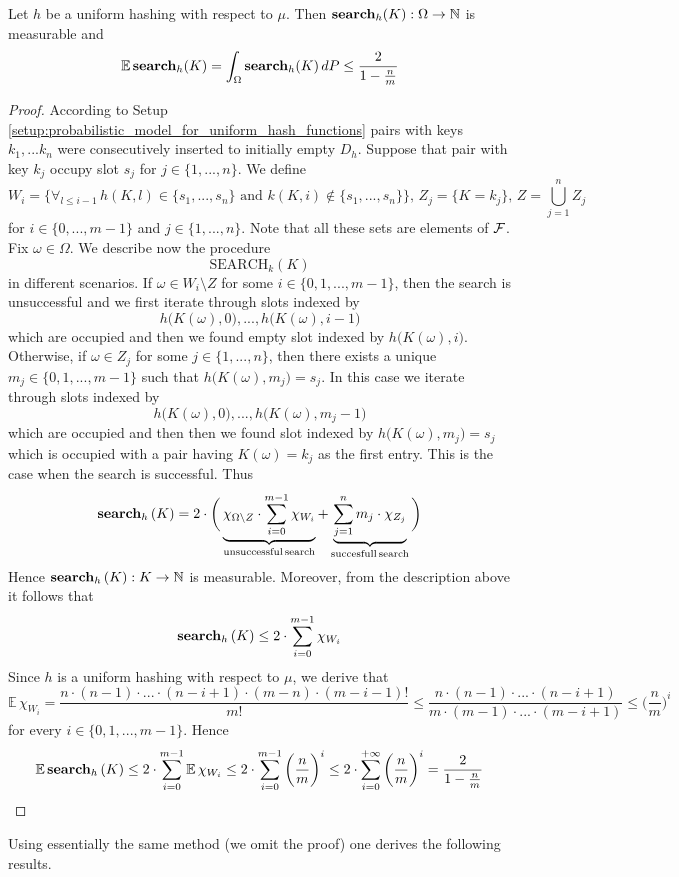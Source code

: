 \begin{theorem}\label{theorem:open_addressing_under_uniform_hashing_analysis_of_search}
Let $h$ be a uniform hashing with respect to $\mu$. Then $\mathbf{search}_h(K):\Omega \rightarrow {\mathbb N}$ is measurable and
$$\mathbb{E}\,\mathbf{search}_h(K) = \int_{\Omega}\mathbf{search}_h(K)\,dP \leq \frac{2}{1 - \frac{n}{m}}$$
\end{theorem}
\begin{proof}
According to Setup \ref{setup:probabilistic_model_for_uniform_hash_functions} pairs with keys $k_1,...k_n$ were consecutively inserted to initially empty $D_h$. Suppose that pair with key $k_j$ occupy slot $s_j$ for $j\in \{1,...,n\}$. We define
$$W_i = \big\{\forall_{l\leq i-1}\,h(K,l)\in \{s_1,...,s_n\}\mbox{ and }k(K,i) \not \in \{s_1,...,s_n\}\big\},\,Z_{j} = \big\{K = k_j\big\},\,Z = \bigcup_{j=1}^nZ_j$$
for $i\in \{0,...,m-1\}$ and $j\in \{1,...,n\}$. Note that all these sets are elements of ${\mathcal F}$. Fix $\omega \in \Omega$. We describe now the procedure
$$\mathrm{SEARCH}_k(K)$$
in different scenarios. If $\omega \in W_i\setminus Z$ for some $i\in \{0,1,...,m-1\}$, then the search is unsuccessful and we first iterate through slots indexed by
$$h\big(K(\omega),0\big),...,h\big(K(\omega), i-1\big)$$
which are occupied and then we found empty slot indexed by $h\big(K(\omega),i\big)$. Otherwise, if $\omega \in Z_j$ for some $j\in \{1,...,n\}$, then there exists a unique $m_j\in \{0,1,...,m-1\}$ such that $h\big(K(\omega),m_j\big) = s_j$. In this case we iterate through slots indexed by
$$h\big(K(\omega),0\big),...,h\big(K(\omega), m_j-1\big)$$
which are occupied and then then we found slot indexed by $h\big(K(\omega),m_j\big) = s_j$ which is occupied with a pair having $K(\omega) = k_j$ as the first entry. This is the case when the search is successful. Thus
$$\mathbf{search}_h\left(K\right) = 2 \cdot \bigg(\underbrace{\chi_{\Omega\setminus Z}\cdot\sum_{i=0}^{m-1} \chi_{W_{i}}}_{\mathrm{unsuccessful\,search}} + \underbrace{\sum_{j=1}^n m_j\cdot \chi_{Z_j}}_{\mathrm{succesfull\,search}}\bigg)$$
Hence $\mathbf{search}_h\left(K\right):K\rightarrow {\mathbb N}$ is measurable. Moreover, from the description above it follows that
$$\mathbf{search}_h\left(K\right) \leq 2 \cdot \sum_{i=0}^{m-1} \chi_{W_{i}}$$
Since $h$ is a uniform hashing with respect to $\mu$, we derive that
$$\mathbb{E}\,\chi_{W_{i}} = \frac{n\cdot (n-1)\cdot ...\cdot (n-i+1) \cdot (m-n) \cdot (m - i - 1)!}{m!} \leq \frac{n\cdot (n-1)\cdot ...\cdot (n- i + 1)}{m\cdot (m-1)\cdot ...\cdot (m - i + 1)}\leq \bigg(\frac{n}{m}\bigg)^i$$
for every $i\in \{0,1,...,m-1\}$. Hence
$$\mathbb{E}\,\mathbf{search}_h\left(K\right) \leq 2 \cdot \sum_{i=0}^{m-1} \mathbb{E}\,\chi_{W_{i}} \leq 2\cdot \sum_{i=0}^{m-1}\bigg(\frac{n}{m}\bigg)^i \leq 2\cdot \sum_{i=0}^{+\infty}\bigg(\frac{n}{m}\bigg)^i = \frac{2}{1 - \frac{n}{m}}$$ 
\end{proof}
\noindent
Using essentially the same method (we omit the proof) one derives the following results.

